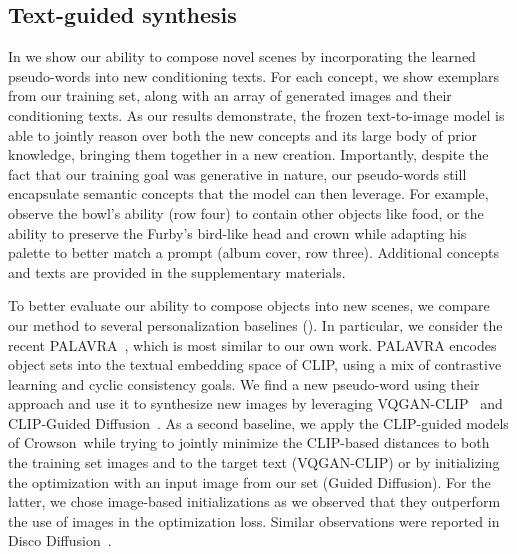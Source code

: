 \subsection{Text-guided synthesis}



In  we show our ability to compose novel scenes by incorporating the learned pseudo-words into new conditioning texts. For each concept, we show exemplars from our training set, along with an array of generated images and their conditioning texts. As our results demonstrate, the frozen text-to-image model is able to jointly reason over both the new concepts and its large body of prior knowledge, bringing them together in a new creation. Importantly, despite the fact that our training goal was generative in nature, our pseudo-words still encapsulate semantic concepts that the model can then leverage. For example, observe the bowl's ability (row four) to contain other objects like food, or the ability to preserve the Furby's bird-like head and crown while adapting his palette to better match a prompt (album cover, row three). Additional concepts and texts are provided in the supplementary materials.




To better evaluate our ability to compose objects into new scenes, we compare our method to several personalization baselines (). In particular, we consider the recent PALAVRA~\citep{cohen2022my}, which is most similar to our own work. PALAVRA encodes object sets into the textual embedding space of CLIP, using a mix of contrastive learning and cyclic consistency goals. We find a new pseudo-word using their approach and use it to synthesize new images by leveraging VQGAN-CLIP~\citep{crowson2022vqgan} and CLIP-Guided Diffusion~\citep{crowson2021diffusion}. As a second baseline, we apply the CLIP-guided models of Crowson~\etal while trying to jointly minimize the CLIP-based distances to both the training set images and to the target text (VQGAN-CLIP) or by initializing the optimization with an input image from our set (Guided Diffusion). For the latter, we chose image-based initializations as we observed that they outperform the use of images in the optimization loss. Similar observations were reported in Disco Diffusion~\citep{lettsDiscoDiffusion2021}.

